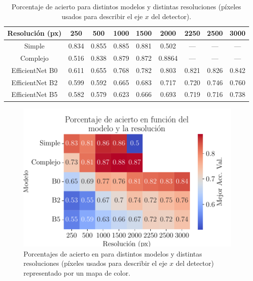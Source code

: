 \documentclass[a4paper,12pt,twoside,titlepage]{article}
\begin{document}
\begin{table}[h!]
  \centering
  \begin{tabular}{|c|c|c|c|c|c|c|c|c|}
  \hline
  Resolución (px) & 250   & 500   & 1000  & 1500  & 2000  & 2250   & 2500   & 3000    \\ \hline\hline %
  Simple          & 0.834 & 0.855 & 0.885 & 0.881 & 0.502 & ---    & ---    & ---     \\ \hline       %
  Complejo        & 0.516 & 0.838 & 0.879 & 0.872 & 0.8864 & ---    & ---    & ---     \\ \hline       %
  EfficientNet B0 & 0.611 & 0.655 & 0.768 & 0.782 & 0.803 & 0.821  & 0.826  & 0.842   \\ \hline       %
  EfficientNet B2 & 0.599 & 0.592 & 0.665 & 0.683 & 0.717 & 0.720  & 0.746  & 0.760   \\ \hline       %
  EfficientNet B5 & 0.582 & 0.579 & 0.623 & 0.666 & 0.693 & 0.719  & 0.716  & 0.738   \\ \hline       %
  \end{tabular}
  \caption{Porcentaje de acierto para distintos modelos y distintas resoluciones (píxeles usados para describir el eje $x$ del detector).}
  \label{tab:estudio_res}
\end{table}

\begin{figure}[h!]
  \centering
  \includegraphics[scale=0.85]{tab_res.pdf}
  \caption{Porcentajes de acierto en para distintos modelos y distintas resoluciones (píxeles usados para describir el eje $x$ del detector) representado por un mapa de color.}
  \label{fig:estudio_res}
\end{figure}
\end{document}
